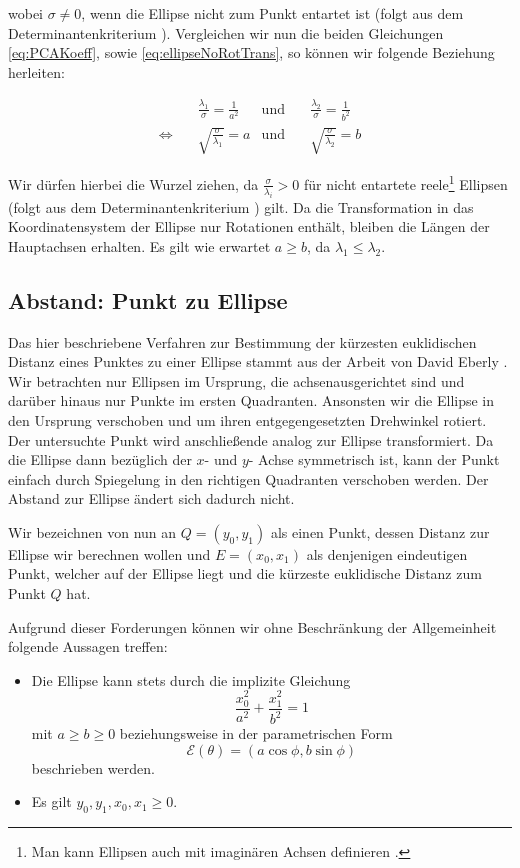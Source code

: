 wobei $\sigma \neq 0$, wenn die Ellipse nicht zum Punkt entartet ist (folgt aus dem Determinantenkriterium \cite{Lawrence1972}). Vergleichen wir nun die beiden Gleichungen \ref{eq:PCAKoeff}, sowie \ref{eq:ellipseNoRotTrans}, so können wir folgende Beziehung herleiten: 

\begin{equation}
\begin{aligned}
&\frac{\lambda_1}{\sigma} = \frac{1}{a^2} &\text{und}\quad &\frac{\lambda_2}{\sigma} = \frac{1}{b^2}\\
\Leftrightarrow\quad & \sqrt{\frac{\sigma}{\lambda_1}}  = a  &\text{und}\quad & \sqrt{\frac{\sigma}{\lambda_2}}  = b
\end{aligned}
\end{equation}

Wir dürfen hierbei die Wurzel ziehen, da $\frac{\sigma}{\lambda_i} > 0$ für nicht entartete reele\footnote{Man kann Ellipsen auch mit imaginären Achsen definieren \cite{Lawrence1972}.}  Ellipsen (folgt aus dem Determinantenkriterium \cite{Lawrence1972}) gilt. Da die Transformation in das Koordinatensystem der Ellipse nur Rotationen enthält,  bleiben die Längen der Hauptachsen erhalten. Es gilt wie erwartet $a \geq b$, da $\lambda_1 \leq \lambda_2$. 


\subsection{Abstand: Punkt zu Ellipse}
\label{sc:distPointEllipse}
Das hier beschriebene Verfahren zur Bestimmung der kürzesten euklidischen Distanz eines Punktes zu einer Ellipse stammt aus der Arbeit von David Eberly \cite{Eberly2013}.
Wir betrachten nur Ellipsen im Ursprung, die achsenausgerichtet sind und darüber hinaus nur Punkte im ersten Quadranten. Ansonsten wir die Ellipse in den Ursprung verschoben und um ihren entgegengesetzten Drehwinkel rotiert. 
Der untersuchte Punkt wird anschließende analog zur Ellipse transformiert. 
Da die Ellipse dann bezüglich der $x$- und $y$- Achse symmetrisch ist, kann der Punkt einfach durch Spiegelung in den richtigen Quadranten verschoben werden. Der Abstand zur Ellipse ändert sich dadurch nicht. 

Wir bezeichnen von nun an $Q = (y_0, y_1)$ als einen Punkt, dessen Distanz zur Ellipse wir berechnen wollen und $E = (x_0, x_1)$ als denjenigen eindeutigen Punkt, welcher auf der Ellipse liegt und die kürzeste euklidische Distanz zum Punkt $Q$ hat. 

Aufgrund dieser Forderungen können wir ohne Beschränkung der Allgemeinheit folgende Aussagen treffen:
\begin{itemize}
	\item Die Ellipse kann stets durch die implizite Gleichung 
	\begin{equation}\label{eq:distEqParam} \frac{x_0^2}{a^2} + \frac{x_1^2}{b^2} = 1\end{equation}
	 mit $a \geq b \geq 0$ beziehungsweise
	in der parametrischen Form \[\mathcal{E}(\theta) = (a\cos\phi, b\sin\phi)  \tag*{$\phi \in [0, 2\pi)$}\] beschrieben werden.
	\item Es gilt $y_0,y_1,x_0, x_1 \geq 0$.
\end{itemize}

